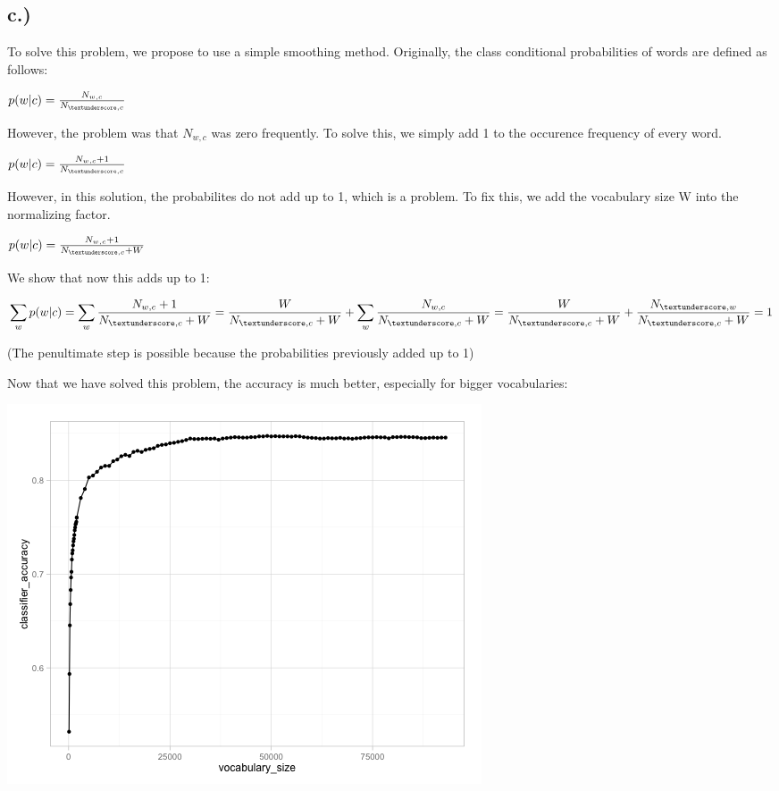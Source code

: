 \documentclass[%
   11pt,              %
   ngerman,           %
   a4paper,           %
   DIV11,             %
]{scrartcl}%
\begin{document}
\subsection*{c.)}

To solve this problem, we propose to use a simple smoothing method.
Originally, the class conditional probabilities of words are defined as follows:

$p(w|c) = \frac{N_{w,c}}{N_{\textunderscore,c}}$

However, the problem was that $N_{w,c}$ was zero frequently. To solve this, we simply add 1 to the occurence frequency of every word.

$p(w|c) = \frac{N_{w,c}+1}{N_{\textunderscore,c}}$

However, in this solution, the probabilites do not add up to 1, which is a problem. To fix this, we add the vocabulary size W into the normalizing factor.

$p(w|c) = \frac{N_{w,c}+1}{N_{\textunderscore,c}+W}$

We show that now this adds up to 1:

$\displaystyle\sum_w p(w|c) = \displaystyle\sum_w \frac{N_{w,c}+1}{N_{\textunderscore,c}+W} = \frac{W}{N_{\textunderscore,c}+W} + \displaystyle\sum_w \frac{N_{w,c}}{N_{\textunderscore,c}+W} = \frac{W}{N_{\textunderscore,c}+W} + \frac{N_{\textunderscore,w}}{N_{\textunderscore,c}+W} = 1$

(The penultimate step is possible because the probabilities previously added up to 1)

Now that we have solved this problem, the accuracy is much better, especially for bigger vocabularies:

\includegraphics[width=\textwidth]{exercise03.1/accuracy_smoothed.png}
\end{document}
